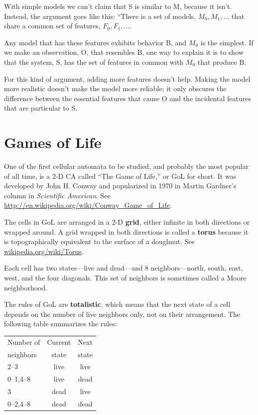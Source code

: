\documentclass[10pt]{book}
\begin{document}
With simple models we can't claim that S is similar to M, because it
isn't.  Instead, the argument goes like this: ``There is a set of
models, ${M_0, M_1, ...}$ that share a common set of features, ${F_0,
  F_1, ...}$.  

Any model that has these features exhibits behavior B, and $M_0$ is
the simplest.  If we make an observation, O, that resembles B, one way
to explain it is to show that the system, S, has the set of
features in common with $M_0$ that produce B.

For this kind of argument, adding more features doesn't help.  Making
the model more realistic doesn't make the model more reliable; it only
obscures the difference between the essential features that cause O
and the incidental features that are particular to S.


\chapter{Games of Life}

One of the first cellular automata to be studied, and probably the
most popular of all time, is a 2-D CA called ``The Game of Life,'' or GoL
for short.  It was developed by John H. Conway and popularized in 1970
in Martin Gardner's column in {\em Scientific American}.
See \url{http://en.wikipedia.org/wiki/Conway_Game_of_Life}.

The cells in GoL are arranged in a 2-D {\bf grid}, 
either infinite in both
directions or wrapped around.  A grid wrapped
in both directions is called a {\bf torus} because it is topographically
equivalent to the surface of a doughnut.
See \url{wikipedia.org/wiki/Torus}.

Each cell has two states---live and dead---and 8 neighbors---north,
south, east, west, and the four diagonals.  This set of neighbors
is sometimes called a Moore neighborhood.

The rules of GoL are {\bf totalistic}, which means that the next
state of a cell depends on the number of live neighbors only, 
not on their arrangement.  The following table summarizes the
rules:

\begin{tabular}{|l|c|c|}
\hline
Number of     &   Current      & Next \\
neighbors     &   state        & state \\
\hline
2--3          &   live           & live         \\
0--1,4--8     &   live           & dead         \\
3             &   dead           & live         \\
0--2,4--8     &   dead           & dead         \\
\hline
\end{tabular}
\end{document}
